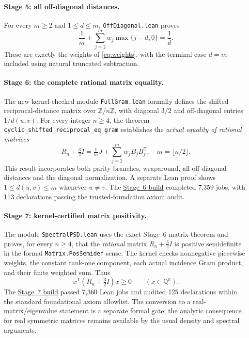 \paragraph{Stage 5: all off-diagonal distances.}
For every $m\ge2$ and $1\le d\le m$,
\texttt{OffDiagonal.lean} proves
\begin{equation}\label{eq:lean-offdiag}
\frac1m+\sum_{j=2}^{m}w_j\max\{j-d,0\}=\frac1d.
\end{equation}
These are exactly the weights of \eqref{eq:weights}, with the
terminal case $d=m$ included using natural truncated subtraction.


\paragraph{Stage 6: the complete rational matrix equality.}
The new kernel-checked module \texttt{FullGram.lean} formally defines
the shifted reciprocal-distance matrix over $\mathbb Z/n\mathbb Z$,
with diagonal $3/2$ and off-diagonal entries $1/d(u,v)$.
For every integer $n\ge4$, the theorem
\texttt{cyclic\_shifted\_reciprocal\_eq\_gram} establishes
the \emph{actual equality of rational matrices}
\begin{equation}\label{eq:lean-fullgram}
R_n+\tfrac32I=\tfrac1mJ+\sum_{j=2}^m w_jB_jB_j^{\mathsf T},
\quad m=\lfloor n/2\rfloor.
\end{equation}
This result incorporates both parity branches, wraparound, all
off-diagonal distances and the diagonal normalization.
A separate Lean proof shows $1\le d(u,v)\le m$ whenever $u\ne v$.
The \href{https://github.com/tonynewton79-web/newton-400-conjectures/actions/runs/39133219628}{Stage~6 build}
completed 7,359 jobs, with 113 declarations passing the
trusted-foundation axiom audit.


\paragraph{Stage 7: kernel-certified matrix positivity.}
The module \texttt{SpectralPSD.lean} uses the exact Stage~6
matrix theorem and proves, for every $n\ge4$, that the
\emph{rational} matrix $R_n+\tfrac32I$ is positive semidefinite
in the formal \texttt{Matrix.PosSemidef} sense. The kernel
checks nonnegative piecewise weights, the constant rank-one
component, each actual incidence Gram product, and their
finite weighted sum. Thus
\begin{equation}\label{eq:lean-psd}
x^{\mathsf T}(R_n+\tfrac32I)x\ge0
\qquad(x\in\mathbb Q^n).
\end{equation}
The \href{https://github.com/tonynewton79-web/newton-400-conjectures/actions/runs/39134282319}{Stage~7 build}
passed 7,360 Lean jobs and audited 125 declarations within
the standard foundational axiom allowlist. The conversion to
a real-matrix/eigenvalue statement is a separate formal gate;
the analytic consequence for real symmetric matrices remains
available by the usual density and spectral arguments.


